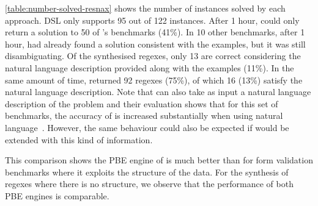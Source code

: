 
\color{blue}
\autoref{table:number-solved-resnax} shows the number of instances solved by each approach. \Forest{} DSL only supports 95 out of 122 instances. After 1 hour, \Forest{} could only return a solution to 50 of \Regel{}'s benchmarks (41\%). In 10 other benchmarks, after 1 hour, \Forest{} had already found a solution consistent with the examples, but it was still disambiguating. Of the synthesised regexes, only 13 are correct considering the natural language description provided along with the examples (11\%). In the same amount of time, \Regel{} returned 92 regexes (75\%), of which 16 (13\%) satisfy the natural language description. Note that \Regel{} can also take as input a natural language description of the problem and their evaluation shows that for this set of benchmarks, the accuracy of \Regel{} is increased substantially when using natural language~\cite{Regel20}. However, the same behaviour could also be expected if \Forest{} would be extended with this kind of information.

This comparison shows the PBE engine of \Forest{} is much better than \Regel{} for form validation benchmarks where it exploits the structure of the data. For the synthesis of regexes where there is no structure, we observe that the performance of both PBE engines is comparable.
\color{black}